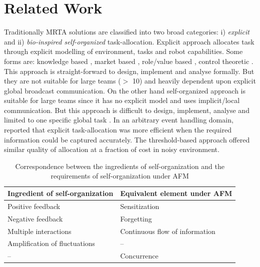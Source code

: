 \documentclass[smallcondensed]{svjour3}
\begin{document}
\section{Related Work}
\label{sec:rw}
Traditionally MRTA solutions are classified into two broad categories: i) {\em explicit} and ii) {\em bio-inspired self-organized} task-allocation.  Explicit approach allocates task through explicit modelling of environment, tasks and robot capabilities. Some forms are: knowledge based \citep{Parker1998}, market based \citep{Dias+2006}, role/value based \citep{Chaimowicz2002}, control theoretic \citep{Belta+2004}. This approach is straight-forward to design, implement and analyse formally. But they are not suitable for large teams ($>$ 10)  and heavily dependent upon explicit global broadcast communication.  On the other hand self-organized approach is suitable for large teams since it has no explicit model and uses implicit/local communication. But this approach is difficult to design, implement, analyse and limited to one specific global task \citep{Gerkey+2004}. In an arbitrary event handling domain,  \cite{kalra+2007} reported that explicit task-allocation was more efficient when the required information could be captured accurately. The threshold-based approach offered similar quality of allocation at a fraction of cost in noisy environment. 
\begin{table}
\label{table:so-afm}
\caption{Correspondence between the ingredients of self-organization and the requirements of self-organization under AFM}
\begin{center}
\begin{tabular}{|p{1.2in}|p{1.2in}|}
\hline  Ingredient of \protect\newline self-organization & Equivalent element under AFM \\ 
\hline Positive feedback &  Sensitization\\ 
\hline Negative feedback &  Forgetting\\ 
\hline Multiple interactions &  Continuous flow \protect\newline of information\\ 
\hline Amplification of fluctuations & -- \\ 
\hline  -- &  Concurrence\\ 
\hline 
\end{tabular} 
\end{center}
\end{table}
\end{document}

